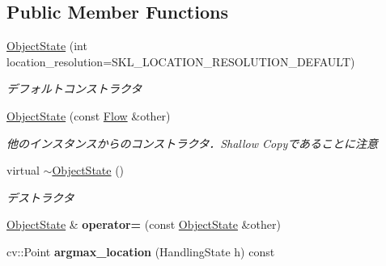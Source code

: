 \subsection*{Public Member Functions}
\begin{DoxyCompactItemize}
\item 
\hypertarget{classskl_1_1_object_state_a3bc97a3a7493cbef68d9442e3e0711e5}{}\label{classskl_1_1_object_state_a3bc97a3a7493cbef68d9442e3e0711e5} 
\hyperlink{classskl_1_1_object_state_a3bc97a3a7493cbef68d9442e3e0711e5}{Object\+State} (int location\+\_\+resolution=S\+K\+L\+\_\+\+L\+O\+C\+A\+T\+I\+O\+N\+\_\+\+R\+E\+S\+O\+L\+U\+T\+I\+O\+N\+\_\+\+D\+E\+F\+A\+U\+LT)
\begin{DoxyCompactList}\small\item\em デフォルトコンストラクタ \end{DoxyCompactList}\item 
\hypertarget{classskl_1_1_object_state_a622db4af996ce80f6b4fd4f3b788a876}{}\label{classskl_1_1_object_state_a622db4af996ce80f6b4fd4f3b788a876} 
\hyperlink{classskl_1_1_object_state_a622db4af996ce80f6b4fd4f3b788a876}{Object\+State} (const \hyperlink{classskl_1_1_flow}{Flow} \&other)
\begin{DoxyCompactList}\small\item\em 他のインスタンスからのコンストラクタ．\+Shallow Copyであることに注意 \end{DoxyCompactList}\item 
\hypertarget{classskl_1_1_object_state_a4a6f7317a6fa42f6080b38573d205373}{}\label{classskl_1_1_object_state_a4a6f7317a6fa42f6080b38573d205373} 
virtual \hyperlink{classskl_1_1_object_state_a4a6f7317a6fa42f6080b38573d205373}{$\sim$\+Object\+State} ()
\begin{DoxyCompactList}\small\item\em デストラクタ \end{DoxyCompactList}\item 
\hypertarget{classskl_1_1_object_state_a4be418599ae600c7e3beeeaddf69e44a}{}\label{classskl_1_1_object_state_a4be418599ae600c7e3beeeaddf69e44a} 
\hyperlink{classskl_1_1_object_state}{Object\+State} \& {\bfseries operator=} (const \hyperlink{classskl_1_1_object_state}{Object\+State} \&other)
\item 
\hypertarget{classskl_1_1_object_state_ab74af07c26fc335bd43ee486475cad13}{}\label{classskl_1_1_object_state_ab74af07c26fc335bd43ee486475cad13} 
cv\+::\+Point {\bfseries argmax\+\_\+location} (Handling\+State h) const
\item 
\hypertarget{classskl_1_1_object_state_afd29f207af856e1a00a9d957d2296316}{}\label{classskl_1_1_object_state_afd29f207af856e1a00a9d957d2296316} 

\end{DoxyCompactItemize}
